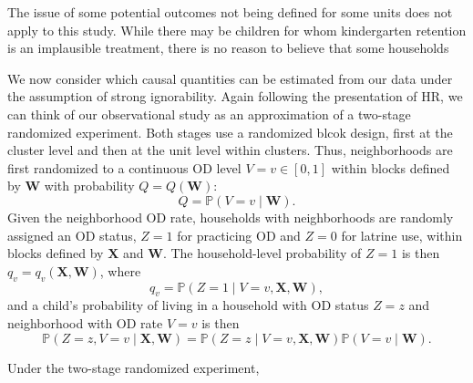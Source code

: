 \documentclass[11pt,a4paper]{article}
\begin{document}
The issue of some potential outcomes not being defined for some units does not apply to this study. While there may be children for whom kindergarten retention is an implausible treatment, there is no reason to believe that some households 

We now consider which causal quantities can be estimated from our data under the assumption of strong ignorability. Again following the presentation of HR, we can think of our observational study as an approximation of a two-stage randomized experiment. Both stages use a randomized blcok design, first at the cluster level and then at the unit level within clusters. Thus, neighborhoods are first randomized to a continuous OD level $V = v \in [0,1]$ within blocks defined by $\mathbf{W}$ with probability $Q = Q(\mathbf{W})$: 
\begin{equation}\label{eq:Q_def}
	Q = \mathbb{P}(V=v \mid \mathbf{W}).
\end{equation}
Given the neighborhood OD rate, households with neighborhoods are randomly assigned an OD status, $Z=1$ for practicing OD and $Z=0$ for latrine use, within blocks defined by $\mathbf{X}$ and $\mathbf{W}$. The household-level probability of $Z=1$ is then $q_v = q_v(\mathbf{X}, \mathbf{W})$, where
\begin{equation}\label{eq:qv_def}
	q_v = \mathbb{P}(Z=1 \mid V=v, \mathbf{X}, \mathbf{W}),
\end{equation}
and a child's probability of living in a household with OD status $Z=z$ and neighborhood with OD rate $V=v$ is then
\begin{equation}\label{eq:joint_prob}
	\mathbb{P}(Z=z, V=v \mid \mathbf{X}, \mathbf{W}) = \mathbb{P}(Z=z \mid V=v, \mathbf{X}, \mathbf{W}) \mathbb{P}(V=v \mid\mathbf{W}).
\end{equation}

Under the two-stage randomized experiment, 

%
\end{document}
